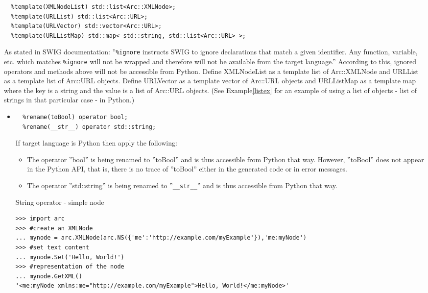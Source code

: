 \documentclass{article}
\begin{document}
\begin{flushleft}
\begin{itemize}
{\begin{verbatim}
  %template(XMLNodeList) std::list<Arc::XMLNode>;
  %template(URLList) std::list<Arc::URL>;
  %template(URLVector) std::vector<Arc::URL>;
  %template(URLListMap) std::map< std::string, std::list<Arc::URL> >;
  \end{verbatim}
  }
  As stated in SWIG documentation: ''\verb$%ignore$ instructs SWIG to ignore 
  declarations that match a given identifier.
  Any function, variable, etc. which matches \verb$%ignore$ will not be wrapped 
  and therefore will not be available from the target language.''
  According to this, ignored operators and methods above will not be accessible 
  from Python. \linebreak
  Define XMLNodeList as a template list of Arc::XMLNode and URLList as a template list of 
  Arc::URL objects. Define URLVector as a template vector of Arc::URL objects and URLListMap 
  as a template map where the key is a string and the value is a list of Arc::URL objects. 
  (See Example\ref{listex} for an example of using a list of objects - 
  list of strings in that particular case - in Python.)\linebreak
\end{itemize}
\begin{itemize}
  \item{
\begin{verbatim}
  %rename(toBool) operator bool;
  %rename(__str__) operator std::string;
\end{verbatim} 
    If target language is Python then apply the following:
    \begin{itemize}
      \item{
      The operator ''bool'' is being renamed to ''toBool'' and is thus accessible from Python that way. 
      However, ''toBool'' does not appear in the Python API, that is, there is no trace of ''toBool'' 
      either in the generated code or in error messages.
      }
      \item{
      The operator ''std::string'' is being renamed to ''\verb$__str__$'' and is thus accessible from 
      Python that way.
      }
    \end{itemize}
    \begin{example}
      \caption{String operator - simple node}\label{strex1}
\begin{verbatim}
>>> import arc
>>> #create an XMLNode
... mynode = arc.XMLNode(arc.NS({'me':'http://example.com/myExample'}),'me:myNode')
>>> #set text content
... mynode.Set('Hello, World!')
>>> #representation of the node
... mynode.GetXML()
'<me:myNode xmlns:me="http://example.com/myExample">Hello, World!</me:myNode>'

\end{verbatim}
\end{example}}
\end{itemize}
\end{flushleft}
\end{document}
